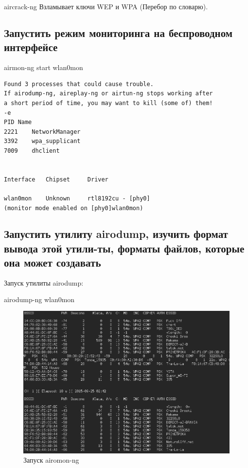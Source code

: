 \documentclass[11pt, a4paper]{article}		%
\begin{document}
aircrack-ng	Взламывает ключи WEP и WPA (Перебор по словарю).




\subsection{Запустить режим мониторинга на беспроводном интерфейсе}

airmon-ng start wlan0mon

\begin{verbatim}
Found 3 processes that could cause trouble.
If airodump-ng, aireplay-ng or airtun-ng stops working after
a short period of time, you may want to kill (some of) them!
-e 
PID	Name
2221	NetworkManager
3392	wpa_supplicant
7009	dhclient


Interface	Chipset		Driver

wlan0mon	Unknown 	rtl8192cu - [phy0]
(monitor mode enabled on [phy0]wlan0mon)

\end{verbatim}


\subsection{Запустить утилиту airodump, изучить формат вывода этой утили-ты, форматы файлов, которые она может создавать}

Запуск утилиты airodump:

airodump-ng wlan0mon

\begin{figure}[h!]
	\centering
	\includegraphics[scale=0.60]{res/2}
	\caption{Запуск airomon-ng}
\end{figure}
\end{document}
